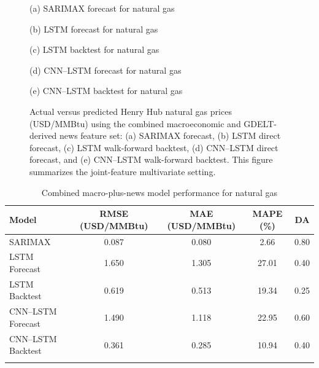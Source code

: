 \documentclass[pdflatex,sn-mathphys-num]{sn-jnl}%
\theoremstyle{thmstyleone}%
\theoremstyle{thmstyletwo}%
\theoremstyle{thmstylethree}%
\begin{document}
\begin{figure}[h]
\centering
\begin{minipage}[t]{0.495\textwidth}
\centering

\small (a) SARIMAX forecast for natural gas
\end{minipage}\hfill
\begin{minipage}[t]{0.495\textwidth}
\centering

\small (b) LSTM forecast for natural gas
\end{minipage}

\vspace{0.5em}

\begin{minipage}[t]{0.495\textwidth}
\centering

\small (c) LSTM backtest for natural gas
\end{minipage}\hfill
\begin{minipage}[t]{0.495\textwidth}
\centering

\small (d) CNN--LSTM forecast for natural gas
\end{minipage}

\vspace{0.5em}

\begin{minipage}[t]{0.495\textwidth}
\centering

\small (e) CNN--LSTM backtest for natural gas
\end{minipage}
\caption{Actual versus predicted Henry Hub natural gas prices (USD/MMBtu) using the combined macroeconomic and GDELT-derived news feature set: (a) SARIMAX forecast, (b) LSTM direct forecast, (c) LSTM walk-forward backtest, (d) CNN--LSTM direct forecast, and (e) CNN--LSTM walk-forward backtest. This figure summarizes the joint-feature multivariate setting.}
\label{fig:combined_cng_plots}
\end{figure}

\begin{table}[h]
\centering
\caption{Combined macro-plus-news model performance for natural gas}
\label{tab:combined_cng}
\begin{tabular}{@{}lcccc@{}}
\toprule
Model & RMSE (USD/MMBtu) & MAE (USD/MMBtu) & MAPE (\%) & DA \\
\midrule
SARIMAX & 0.087 & 0.080 & 2.66 & 0.80 \\
LSTM Forecast & 1.650 & 1.305 & 27.01 & 0.40 \\
LSTM Backtest & 0.619 & 0.513 & 19.34 & 0.25 \\
CNN--LSTM Forecast & 1.490 & 1.118 & 22.95 & 0.60 \\
CNN--LSTM Backtest & 0.361 & 0.285 & 10.94 & 0.40 \\
\botrule
\end{tabular}
\end{table}
\end{document}
